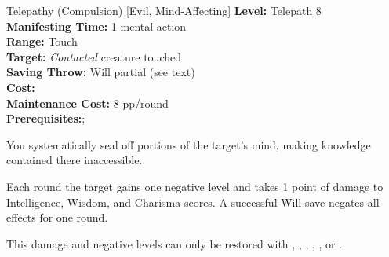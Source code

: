 {Telepathy (Compulsion) [Evil, Mind-Affecting]}
{
	\textbf{Level:}
	Telepath 8\\
	\textbf{Manifesting Time:}
	1 mental action\\
	\textbf{Range:}
	Touch\\
	\textbf{Target:}
	\emph{Contacted} creature touched\\
	\textbf{Saving Throw:}
	Will partial (see text)\\
	\textbf{Cost:}
	\\
	\textbf{Maintenance Cost:}
	8 pp/round\\
	\textbf{Prerequisites:};
	\\
}
{
	You systematically seal off portions of the target's mind, making knowledge contained there inaccessible.

	Each round the target gains one negative level and takes 1 point of damage to Intelligence, Wisdom, and Charisma scores. A successful Will save negates all effects for one round.

	This damage and negative levels can only be restored with , , , , , or . 
}